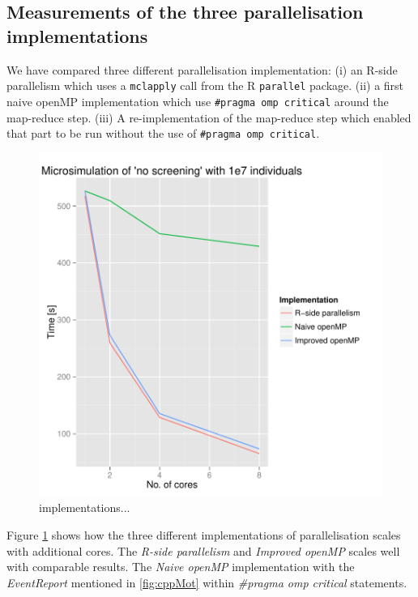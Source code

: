\subsection{Measurements of the three parallelisation implementations}

We have compared three different parallelisation implementation: (i)
an R-side parallelism which uses a \texttt{mclapply} call from the R
\texttt{parallel} package. (ii) a first naive openMP implementation
which use \texttt{\#pragma omp critical} around the map-reduce
step. (iii) A re-implementation of the map-reduce step which enabled
that part to be run without the use of \texttt{\#pragma omp critical}.
\begin{figure}[!htbp] \centering
  \includegraphics[height=0.5\textheight]{images/implementationProfiling.pdf}
  \caption{implementations...}
  \label{fig:implScaling}
\end{figure} 

Figure \ref{fig:implScaling} shows how the three
different implementations of parallelisation scales with additional
cores. The \emph{R-side parallelism} and \emph{Improved openMP} scales
well with comparable results. The \emph{Naive openMP} implementation
with the \emph{EventReport} mentioned in \ref{fig:cppMot} within
\emph{\#pragma omp critical} statements.



